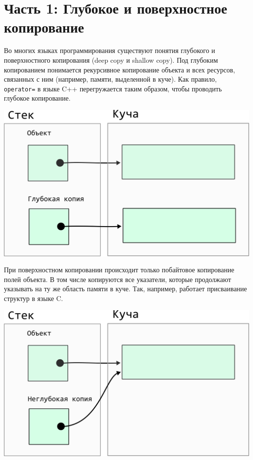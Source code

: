 \documentclass{article}
\begin{document}
\section*{Часть 1: Глубокое и поверхностное копирование}
Во многих языках программирования существуют понятия глубокого и поверхностного копирования (deep copy и shallow copy). Под глубоким копированием понимается рекурсивное копирование объекта и всех ресурсов, связанных с ним (например, памяти, выделенной в куче). Как правило, \texttt{operator=} в языке C++ перегружается таким образом, чтобы проводить глубокое копирование.
\begin{center}
\includegraphics[scale=0.9]{../images/deep.png}
\end{center}

При поверхностном копировании происходит только побайтовое копирование полей объекта. В том числе копируются все указатели, которые продолжают указывать на ту же область памяти в куче. Так, например, работает присваивание структур в языке C.

\begin{center}
\includegraphics[scale=0.9]{../images/shallow.png}
\end{center}
\end{document}
